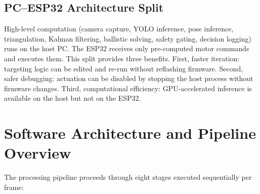 \subsection{PC--ESP32 Architecture Split}

High-level computation (camera capture, YOLO inference, pose inference, triangulation, Kalman filtering, ballistic solving, safety gating, decision logging) runs on the host PC. The ESP32 receives only pre-computed motor commands and executes them. This split provides three benefits. First, faster iteration: targeting logic can be edited and re-run without reflashing firmware. Second, safer debugging: actuation can be disabled by stopping the host process without firmware changes. Third, computational efficiency: GPU-accelerated inference is available on the host but not on the ESP32.

\section{Software Architecture and Pipeline Overview}

The processing pipeline proceeds through eight stages executed sequentially per frame:

